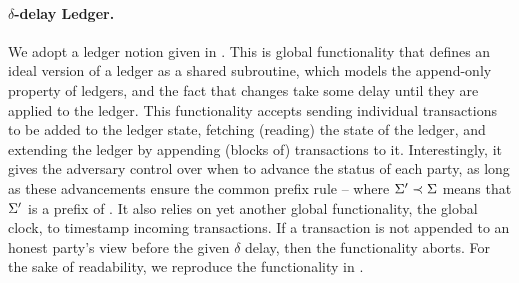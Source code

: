 \paragraph{$\delta$-delay Ledger.} %
We adopt a ledger notion given in \cite{kkk21}. This is global functionality
that defines an ideal version of a ledger as a shared subroutine, which models
the append-only property of ledgers, and the fact that changes take some delay
until they are applied to the ledger.
%
This functionality accepts sending individual transactions to be added to the
ledger state, fetching (reading) the state of the ledger, and extending the
ledger by appending (blocks of) transactions to it. Interestingly, it gives the
adversary control over when to advance the status of each party, as long as
these advancements ensure the common prefix rule -- where $\Sigma' \prec
\Sigma$ means that $\Sigma'$ is a prefix of \ldgState. It also relies
on yet another global functionality, the global clock, to timestamp incoming
transactions. If a transaction is not appended to an honest party's view before
the given $\delta$ delay, then the functionality aborts.
%
For the sake of readability, we reproduce the functionality in
.

